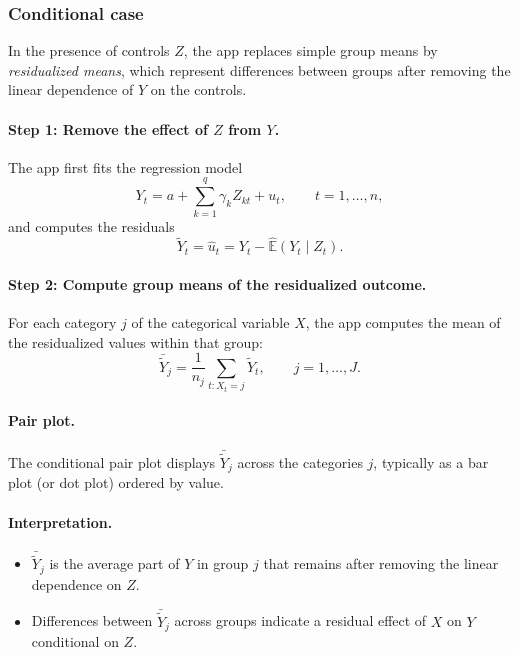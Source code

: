 \documentclass[11pt,a4paper]{article}
\begin{document}
\subsubsection*{Conditional case}

In the presence of controls $Z$, the app replaces simple group means by
\emph{residualized means}, which represent differences between groups after
removing the linear dependence of $Y$ on the controls.

\paragraph{Step 1: Remove the effect of $Z$ from $Y$.}
The app first fits the regression model
\begin{equation}
  Y_t = a + \sum_{k=1}^q \gamma_k Z_{kt} + u_t,
  \qquad t=1,\dots,n,
  \label{eq:Y_on_Z}
\end{equation}
and computes the residuals
\begin{equation}
  \tilde{Y}_t = \hat{u}_t = Y_t - \widehat{\mathbb{E}}(Y_t \mid Z_t).
  \label{eq:residualized_Y}
\end{equation}

\paragraph{Step 2: Compute group means of the residualized outcome.}
For each category $j$ of the categorical variable $X$, the app computes the mean of the residualized values within that group:
\begin{equation}
  \bar{\tilde{Y}}_j
  = \frac{1}{n_j}\sum_{t: X_t=j}\tilde{Y}_t,
  \qquad j=1,\dots,J.
  \label{eq:residualized_means}
\end{equation}

\paragraph{Pair plot.}
The conditional pair plot displays $\bar{\tilde{Y}}_j$ across the categories $j$, typically as a bar plot (or dot plot) ordered by value.

\paragraph{Interpretation.}
\begin{itemize}
  \item $\bar{\tilde{Y}}_j$ is the average part of $Y$ in group $j$ that remains after removing the linear dependence on $Z$.
  \item Differences between $\bar{\tilde{Y}}_j$ across groups indicate a residual effect of $X$ on $Y$ conditional on $Z$.
\end{itemize}
\end{document}
